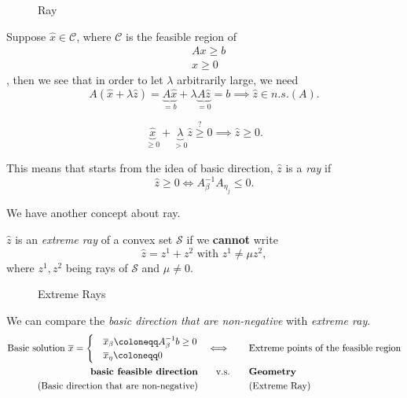 \begin{figure}[H]
	\centering
	\caption{Ray}
	\label{fig:ray}
\end{figure}

Suppose \(\hat{x}\in\mathcal{C}\), where \(\mathcal{C}\) is the feasible region of
\begin{align*}
	 & Ax \geq  b \\
	 & x\geq 0
\end{align*},
then we see that in order to let \(\lambda\) arbitrarily large, we need
\[
	A(\hat{x} + \lambda \hat{z}) = \underbrace{A \hat{x}}_{=b} + \lambda \underbrace{A \hat{z}}_{=0} = b\implies \hat{z} \in n.s.(A).
\]

\begin{problem}
\[
	\underbrace{\hat{x}}_{\geq 0} + \underbrace{\lambda}_{>0} \hat{z} \overset{?}{\geq} 0 \implies \hat{z} \geq 0.
\]
\end{problem}

This means that starts from the idea of basic direction, \(\hat{z}\) is a \emph{ray} if
\[
	\hat{z} \geq 0 \iff A^{-1}_{\beta}A_{\eta_j} \leq 0.
\]

We have another concept about ray.
\begin{definition}
	\(\hat{z}\) is an \emph{extreme ray} of a convex set \(\mathcal{S}\) if we \textbf{cannot} write
	\[
		\hat{z} = z^1 + z^2 \text{ with }z^1 \neq \mu z^2,
	\]
	where \(z^1, z^2\) being rays of \(\mathcal{S}\) and \(\mu\neq 0\).
\end{definition}
\begin{figure}[H]
	\centering
	\caption{Extreme Rays}
	\label{fig:extreme-ray}
\end{figure}

We can compare the \emph{basic direction that are non-negative} with \emph{extreme ray}.
\[
	\begin{alignedat}{4}
		\text{Basic solution }\overline{x}=\begin{cases}
			 & \overline{x}_{\beta}\coloneqq A^{-1}_{\beta}b\geq 0 \\
			 & \overline{x}_{\eta}\coloneqq 0
		\end{cases} &&\quad\iff\qquad&\text{Extreme points of the feasible region}\\
		\text{\textbf{basic feasible direction}} && \quad\text{v.s.}\qquad&\text{\textbf{Geometry}}\\
		\text{(Basic direction that are non-negative)}&& &\text{(Extreme Ray)}
	\end{alignedat}
\]
